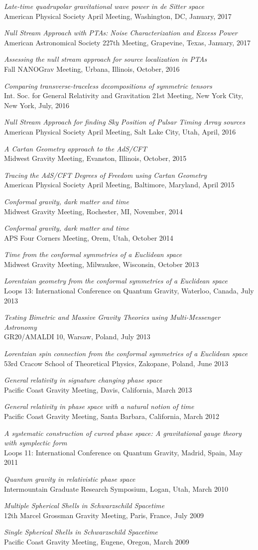 \documentclass[11pt,letterpaper,sans,unicode]{moderncv}
\newcommand{\talkitem}[3]{\item \textit{#1}\\{#2}, #3} %
\begin{document}
\begin{etaremune}[leftmargin=8mm]
\talkitem{Late-time quadrupolar gravitational wave power in de Sitter space}{American Physical Society April Meeting}{Washington, DC, January, 2017}
\talkitem{Null Stream Approach with PTAs: Noise Characterization and Excess Power}{American Astronomical Society 227th Meeting}{Grapevine, Texas, January, 2017}
\talkitem{Assessing the null stream approach for source localization in PTAs}{Fall NANOGrav Meeting}{Urbana, Illinois, October, 2016}
\talkitem{Comparing transverse-traceless decompositions of symmetric tensors}{Int. Soc. for General Relativity and Gravitation 21st Meeting}{New York City, New York, July, 2016}
\talkitem{Null Stream Approach for finding Sky Position of Pulsar Timing Array sources}{American Physical Society April Meeting}{Salt Lake City, Utah, April, 2016}
\talkitem{A Cartan Geometry approach to the AdS/CFT}{Midwest Gravity Meeting}{Evanston, Illinois, October, 2015}
\talkitem{Tracing the AdS/CFT Degrees of Freedom using Cartan Geometry}{American Physical Society April Meeting}{Baltimore, Maryland, April 2015}
\talkitem{Conformal gravity, dark matter and time}{Midwest Gravity Meeting}{Rochester, MI, November, 2014}
\talkitem{Conformal gravity, dark matter and time}{APS Four Corners Meeting}{Orem, Utah, October 2014}
\talkitem{Time from the conformal symmetries of a Euclidean space}{Midwest Gravity Meeting} Milwaukee, Wisconsin, October 2013
\talkitem{Lorentzian geometry from the conformal symmetries of a Euclidean space}{Loops 13: International Conference on Quantum Gravity}{Waterloo, Canada, July 2013}
\talkitem{Testing Bimetric and Massive Gravity Theories using Multi-Messenger Astronomy}{GR20/AMALDI$\;$10}{Warsaw, Poland, July 2013}
\talkitem{Lorentzian spin connection from the conformal symmetries of a Euclidean space}{53rd Cracow School of Theoretical Physics}{Zakopane, Poland, June 2013}
\talkitem{General relativity in signature changing phase space}{Pacific Coast Gravity Meeting}{Davis, California, March 2013}
\talkitem{General relativity in phase space with a natural notion of time}{Pacific Coast Gravity Meeting}{Santa Barbara, California, March 2012}
\talkitem{A systematic construction of curved phase space: A gravitational gauge theory with symplectic form}{Loops 11: International Conference on Quantum Gravity}{Madrid, Spain, May 2011}
\talkitem{Quantum gravity in relativistic phase space}{Intermountain Graduate Research Symposium}{Logan, Utah, March 2010}
\talkitem{Multiple Spherical Shells in Schwarzschild Spacetime}{12th Marcel Grossman Gravity Meeting}{Paris, France, July 2009}
\talkitem{Single Spherical Shells in Schwarzschild Spacetime}{Pacific Coast Gravity Meeting}{Eugene, Oregon, March 2009}


\end{etaremune}
\end{document}
